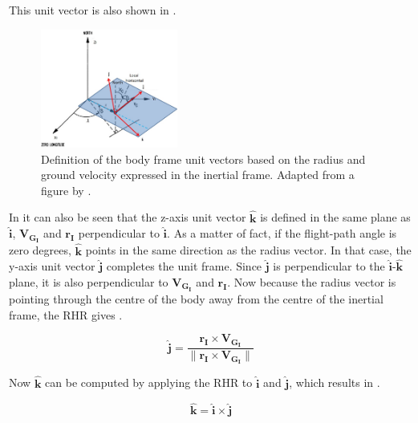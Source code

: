 \noindent
This unit vector is also shown in .

 \begin{figure}[H]
\centering
\includegraphics[width=0.4\textwidth]{figures/reference_frames/cartesian_transformation_mooij1994motion.jpg}
\caption{Definition of the body frame unit vectors based on the radius and ground velocity expressed in the inertial frame. Adapted from a figure by  \cite{mooij1994motion}.}
\label{fig:cartesian_transformation_mooij1994motion}
\end{figure}

\noindent
In  it can also be seen that the z-axis unit vector $\mathbf{\hat{k}}$ is defined in the same plane as $\mathbf{\hat{i}}$, $\mathbf{V_{G_{I}}}$ and $\mathbf{r_{I}}$ perpendicular to $\mathbf{\hat{i}}$. As a matter of fact, if the flight-path angle is zero degrees, $\mathbf{\hat{k}}$ points in the same direction as the radius vector. In that case, the y-axis unit vector $\mathbf{\hat{j}}$ completes the unit frame. Since $\mathbf{\hat{j}}$ is perpendicular to the $\mathbf{\hat{i}}$-$\mathbf{\hat{k}}$ plane, it is also perpendicular to $\mathbf{V_{G_{I}}}$ and $\mathbf{r_{I}}$. Now because the radius vector is pointing through the centre of the body away from the centre of the inertial frame, the \ac{RHR} gives .


\begin{equation} \label{eq:jHat}
\mathbf{\hat{j}} = \dfrac{\mathbf{r_{I} \times \mathbf{V_{G_{I}}}}}{\| \mathbf{r_{I} \times \mathbf{V_{G_{I}}}} \|}
\end{equation}

\noindent
Now $\mathbf{\hat{k}}$ can be computed by applying the \ac{RHR} to $\mathbf{\hat{i}}$ and $\mathbf{\hat{j}}$, which results in .

\begin{equation} \label{eq:kHat}
\mathbf{\hat{k}} = \mathbf{\hat{i}} \times \mathbf{\hat{j}}
\end{equation}

